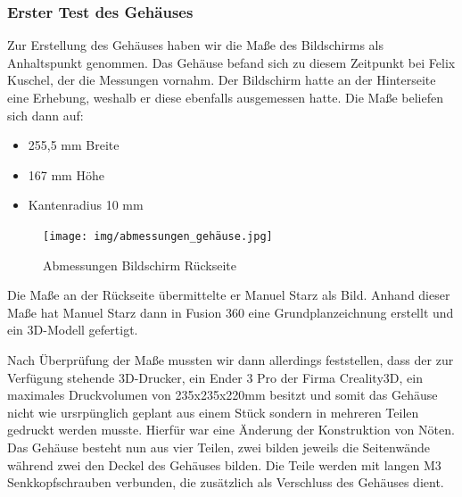 \subsubsection{Erster Test des Gehäuses}\label{hw_case_ersterTest}
Zur Erstellung des Gehäuses haben wir die Maße des Bildschirms als Anhaltspunkt genommen. Das Gehäuse befand sich zu diesem Zeitpunkt bei Felix Kuschel, der die Messungen vornahm. Der Bildschirm hatte an der Hinterseite eine Erhebung, weshalb er diese ebenfalls ausgemessen hatte. Die Maße beliefen sich dann auf:
\begin{itemize}
	\item 255,5 mm Breite
	\item 167 mm Höhe
	\item Kantenradius 10 mm
\end{itemize}
	\begin{figure}[h!t]
		\texttt{[image: img/abmessungen\_gehäuse.jpg]}
		\caption[Abmessungen Bildschirm Rückseite]{Abmessungen Bildschirm Rückseite}
		\label{fig:screen-back-01}
	\end{figure}
	Die Maße an der Rückseite übermittelte er Manuel Starz als Bild. Anhand dieser Maße hat Manuel Starz dann in Fusion 360 eine Grundplanzeichnung erstellt und ein 3D-Modell gefertigt.\par	
	Nach Überprüfung der Maße mussten wir dann allerdings feststellen, dass der zur Verfügung stehende 3D-Drucker, ein Ender 3 Pro der Firma Creality3D, ein maximales Druckvolumen von 235x235x220mm besitzt und somit das Gehäuse nicht wie ursrpünglich geplant aus einem Stück sondern in mehreren Teilen gedruckt werden musste. Hierfür war eine Änderung der Konstruktion von Nöten. Das Gehäuse besteht nun aus vier Teilen, zwei bilden jeweils die Seitenwände während zwei den Deckel des Gehäuses bilden. Die Teile werden mit langen M3 Senkkopfschrauben verbunden, die zusätzlich als Verschluss des Gehäuses dient. \par
	
